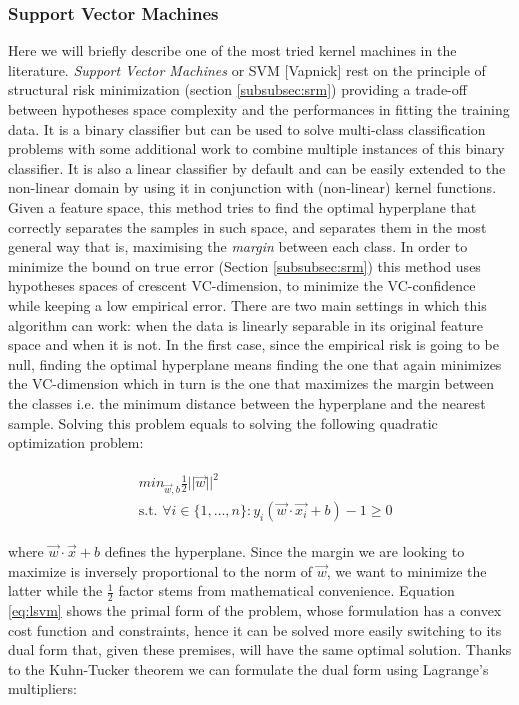 \subsubsection{Support Vector Machines}
\label{subsubsec:svm}
Here we will briefly describe one of the most tried kernel machines in the literature. 
\emph{Support Vector Machines} or SVM [Vapnick] rest on the principle of structural risk
minimization (section \ref{subsubsec:srm}) providing a trade-off between hypotheses
space complexity and the performances in fitting the training data.
It is a binary classifier but can be used to solve multi-class classification
problems with some additional work to combine multiple instances of this binary
classifier.
It is also a linear classifier by default and can be easily extended to the 
non-linear domain by using it in conjunction with (non-linear) kernel functions.
Given a feature space, this method tries to find the optimal hyperplane that
correctly separates the samples in such space, and separates them in the
most general way that is, maximising the \emph{margin} between each class.
In order to minimize the bound on true error (Section \ref{subsubsec:srm})
this method uses hypotheses spaces of crescent VC-dimension, to minimize the
VC-confidence while keeping a low empirical error.
There are two main settings in which this algorithm can work: when the data
is linearly separable in its original feature space and when it is not.
In the first case, since the empirical risk is going to be null, finding the
optimal hyperplane means finding the one that again minimizes the VC-dimension
which in turn is the one that maximizes the margin between the classes i.e.
the minimum distance between the hyperplane and the nearest sample.
Solving this problem equals to solving the following quadratic optimization
problem:

\begin{gather}
    \begin{aligned}
        & min_{\vec{w},b}\frac{1}{2}||\vec{w}||^2 \\
        & \text{s.t. } \forall i \in \{1,\dots, n\} : y_i(\vec{w}\cdot\vec{x_i} + b) - 1 \geq 0 
        \label{eq:lsvm}
    \end{aligned}
\end{gather}

where $\vec{w} \cdot \vec{x} + b$ defines the hyperplane.
Since the margin we are looking to maximize is inversely proportional to the norm
of $\vec{w}$, we want to minimize the latter while the $\frac{1}{2}$ factor stems
from mathematical convenience.
Equation \ref{eq:lsvm} shows the primal form of the problem, whose formulation
has a convex cost function and constraints, hence it can be solved more easily 
switching to its dual form that, given these premises, will have the same
optimal solution.
Thanks to the Kuhn-Tucker theorem we can formulate the dual form using
Lagrange's multipliers:

